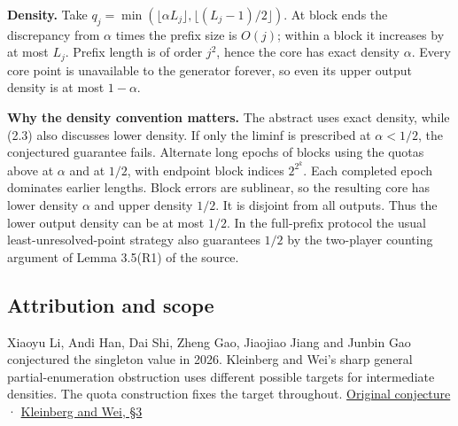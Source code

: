 \documentclass[11pt]{article}
\begin{document}
\textbf{Density.} Take \(q_j=\min(\lfloor\alpha L_j\rfloor,\lfloor(L_j-1)/2\rfloor)\). At block ends the discrepancy from \(\alpha\) times the prefix size is \(O(j)\); within a block it increases by at most \(L_j\). Prefix length is of order \(j^2\), hence the core has exact density \(\alpha\). Every core point is unavailable to the generator forever, so even its upper output density is at most \(1-\alpha\).

\textbf{Why the density convention matters.} The abstract uses exact density, while (2.3) also discusses lower density. If only the liminf is prescribed at \(\alpha<1/2\), the conjectured guarantee fails. Alternate long epochs of blocks using the quotas above at \(\alpha\) and at \(1/2\), with endpoint block indices \(2^{2^k}\). Each completed epoch dominates earlier lengths. Block errors are sublinear, so the resulting core has lower density \(\alpha\) and upper density \(1/2\). It is disjoint from all outputs. Thus the lower output density can be at most \(1/2\). In the full-prefix protocol the usual least-unresolved-point strategy also guarantees \(1/2\) by the two-player counting argument of Lemma 3.5(R1) of the source.

\subsection{Attribution and scope}\label{attribution-and-scope}

Xiaoyu Li, Andi Han, Dai Shi, Zheng Gao, Jiaojiao Jiang and Junbin Gao conjectured the singleton value in 2026. Kleinberg and Wei's sharp general partial-enumeration obstruction uses different possible targets for intermediate densities. The quota construction fixes the target throughout. \href{https://arxiv.org/abs/2606.14688v1}{Original conjecture} · \href{https://arxiv.org/abs/2511.05295}{Kleinberg and Wei, §3}
\end{document}
